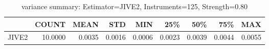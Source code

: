 \begin{table}[ht]
\centering
\caption{variance summary: Estimator=JIVE2, Instruments=125, Strength=0.80}
\begin{tabular}{lrrrrrrrr}
\toprule
 & COUNT & MEAN & STD & MIN & 25\% & 50\% & 75\% & MAX \\
\midrule
JIVE2 & 10.0000 & 0.0035 & 0.0016 & 0.0006 & 0.0023 & 0.0039 & 0.0044 & 0.0055 \\
\bottomrule
\end{tabular}
\end{table}
